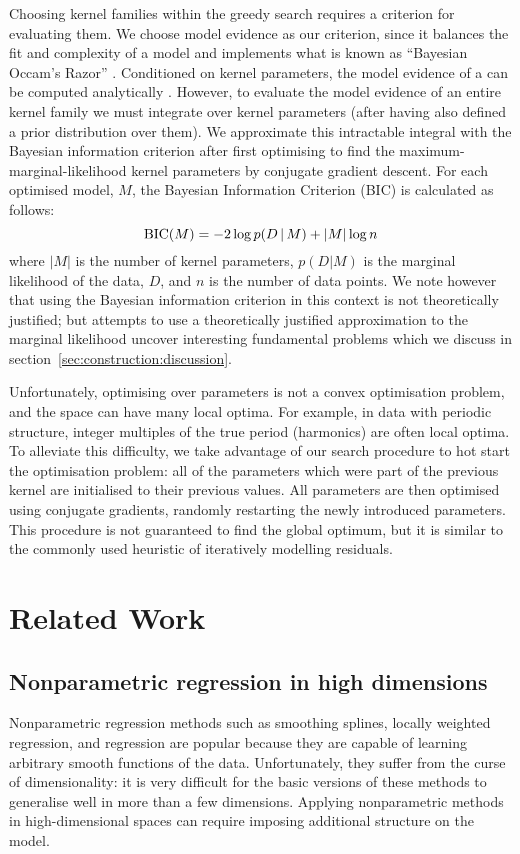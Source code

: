 Choosing kernel families within the greedy search requires a criterion for evaluating them.
We choose model evidence as our criterion, since it balances the fit and complexity of a model and implements what is known as ``Bayesian Occam's Razor'' \citep[e.g.][]{Rasmussen2001-rv, MacKay2003-rp}.
Conditioned on kernel parameters, the model evidence of a \gp{} can be computed analytically \citep[e.g.][]{Rasmussen2006-ml}.
However, to evaluate the model evidence of an entire kernel family we must integrate over kernel parameters (after having also defined a prior distribution over them). 
We approximate this intractable integral with the Bayesian information criterion \citep{Schwarz1978-wp} after first optimising to find the maximum-marginal-likelihood kernel parameters by conjugate gradient descent.
For each optimised model, $M$, the Bayesian Information Criterion (BIC) is calculated as follows:
\begin{equation}
\textrm{BIC}(M) = -2 \log p(D\,|\, M) + |M| \log n
\end{equation}
where $|M|$ is the number of kernel parameters, $p(D|M)$ is the marginal likelihood of the data, $D$, and $n$ is the number of data points.
We note however that using the Bayesian information criterion in this context is not theoretically justified; but attempts to use a theoretically justified approximation to the marginal likelihood uncover interesting fundamental problems which we discuss in section~\ref{sec:construction:discussion}.

Unfortunately, optimising over parameters is not a convex optimisation problem, and the space can have many local optima.
For example, in data with periodic structure, integer multiples of the true period (\ie harmonics) are often local optima. 
To alleviate this difficulty, we take advantage of our search procedure to hot start the optimisation problem: all of the parameters which were part of the previous kernel are initialised to their previous values.
All parameters are then optimised using conjugate gradients, randomly restarting the newly introduced parameters.
This procedure is not guaranteed to find the global optimum, but it is similar to the commonly used heuristic of iteratively modelling residuals.

\section{Related Work}
\label{sec:construction:related_work}

\subsection{Nonparametric regression in high dimensions}
Nonparametric regression methods such as smoothing splines, locally weighted regression, and \gp{} regression are popular because they are capable of learning arbitrary smooth functions of the data.
Unfortunately, they suffer from the curse of dimensionality: it is very difficult for the basic versions of these methods to generalise well in more than a few dimensions.
Applying nonparametric methods in high-dimensional spaces can require imposing additional structure on the model.

